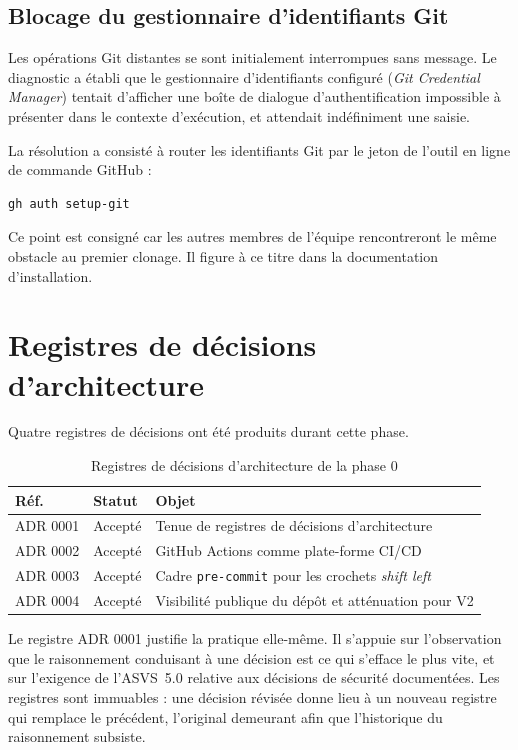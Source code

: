 \subsection{Blocage du gestionnaire d'identifiants Git}

Les opérations Git distantes se sont initialement interrompues sans message.
Le diagnostic a établi que le gestionnaire d'identifiants configuré
(\emph{Git Credential Manager}) tentait d'afficher une boîte de dialogue
d'authentification impossible à présenter dans le contexte d'exécution, et
attendait indéfiniment une saisie.

La résolution a consisté à router les identifiants Git par le jeton de l'outil
en ligne de commande GitHub :

\begin{lstlisting}[language=bash,numbers=none]
gh auth setup-git
\end{lstlisting}

Ce point est consigné car les autres membres de l'équipe rencontreront le même
obstacle au premier clonage. Il figure à ce titre dans la documentation
d'installation.

\section{Registres de décisions d'architecture}

Quatre registres de décisions ont été produits durant cette phase.

\begin{table}[H]
\centering
\caption{Registres de décisions d'architecture de la phase 0}
\label{tab:adr-phase0}
\small
\begin{tabular}{@{}llp{8.2cm}@{}}
\toprule
\textbf{Réf.} & \textbf{Statut} & \textbf{Objet} \\
\midrule
ADR 0001 & Accepté & Tenue de registres de décisions d'architecture \\
ADR 0002 & Accepté & GitHub Actions comme plate-forme CI/CD \\
ADR 0003 & Accepté & Cadre \texttt{pre-commit} pour les crochets \emph{shift left} \\
ADR 0004 & Accepté & Visibilité publique du dépôt et atténuation pour V2 \\
\bottomrule
\end{tabular}
\end{table}

Le registre ADR 0001 justifie la pratique elle-même. Il s'appuie sur
l'observation que le raisonnement conduisant à une décision est ce qui s'efface
le plus vite, et sur l'exigence de l'ASVS~5.0 relative aux décisions de sécurité
documentées. Les registres sont immuables : une décision révisée donne lieu à un
nouveau registre qui remplace le précédent, l'original demeurant afin que
l'historique du raisonnement subsiste.

